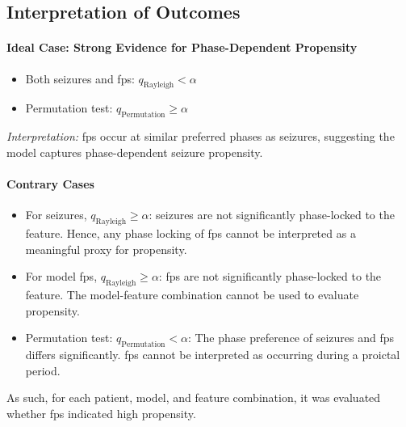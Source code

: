 \subsection{Interpretation of Outcomes} \label{subsec:interpretation-of-outcomes}

\paragraph{Ideal Case: Strong Evidence for Phase-Dependent Propensity}
\begin{itemize}
    \item Both seizures and \glspl{fp}: $q_{\mathrm{Rayleigh}} < \alpha$
    \item Permutation test: $q_{\mathrm{Permutation}} \geq \alpha$
\end{itemize}
\textit{Interpretation:} \Glspl{fp} occur at similar preferred phases as seizures, suggesting the model captures phase-dependent seizure propensity.

\paragraph{Contrary Cases}
\begin{itemize}
    \item For seizures, $q_{\mathrm{Rayleigh}} \geq \alpha$: seizures are not significantly phase-locked to the feature.
    Hence, any phase locking of \glspl{fp} cannot be interpreted as a meaningful proxy for propensity.
    \item For model \glspl{fp}, $q_{\mathrm{Rayleigh}} \geq \alpha$: \glspl{fp} are not significantly phase-locked to the feature.
    The model-feature combination cannot be used to evaluate propensity.
    \item Permutation test: $q_{\mathrm{Permutation}} < \alpha$: The phase preference of seizures and \glspl{fp} differs significantly.
    \Glspl{fp} cannot be interpreted as occurring during a proictal period.
\end{itemize}

As such, for each patient, model, and feature combination, it was evaluated whether \glspl{fp} indicated high propensity.